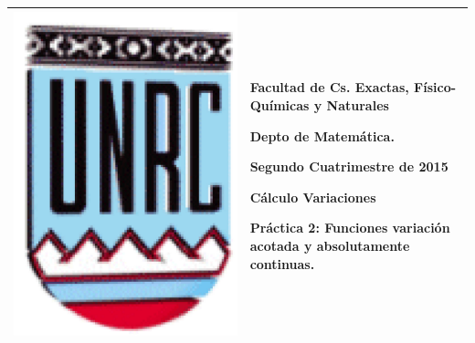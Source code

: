 \documentclass{article}
\begin{document}
\setlength{\unitlength}{1cm}
%
\setlength{\extrarowheight}{5mm}
%

\noindent\begin{tabular}{m{} m{}}\hline\hline
\includegraphics[scale=.4]{imagenes/unrc.jpg} &
\begin{bfseries}  \begin{scshape}
Facultad de Cs. Exactas, Físico-Químicas y Naturales\par
        Depto de Matem\'atica.\par
        Segundo Cuatrimestre de 2015\par
        Cálculo Variaciones \par
        Práctica 2: Funciones variación acotada y absolutamente continuas.

\end{scshape}
\end{bfseries}
\\
\hline\hline
\end{tabular}
\renewcommand{\theenumi}{\alph{enumi}}
\end{document}
